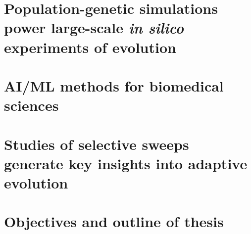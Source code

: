 




\section{Population-genetic simulations power large-scale \textit{in silico} experiments of evolution}





\section{\ac{AI}/\ac{ML} methods for biomedical sciences}

\section{Studies of selective sweeps generate key insights into adaptive evolution}

\section{Objectives and outline of thesis}
